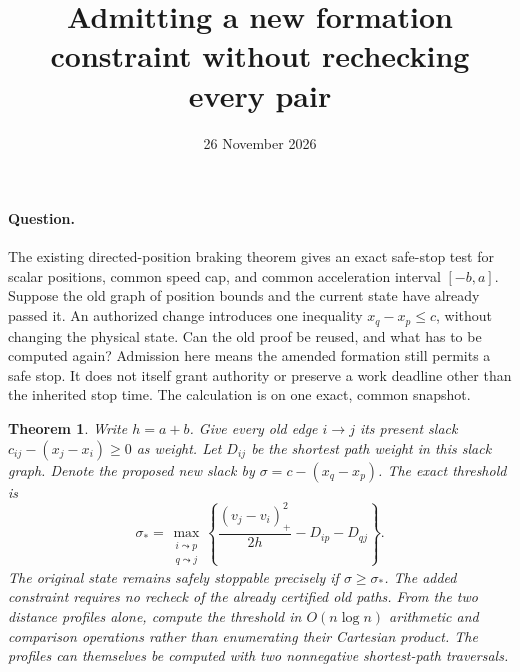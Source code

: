 \documentclass[11pt]{article}
\title{Admitting a new formation constraint without rechecking every pair}
\author{}
\date{26 November 2026}
\newtheorem{theorem}{Theorem}
\begin{document}
\maketitle

\paragraph{Question.}
The existing directed-position braking theorem gives an exact safe-stop test for scalar positions, common speed cap, and common acceleration interval $[-b,a]$. Suppose the old graph of position bounds and the current state have already passed it. An authorized change introduces one inequality $x_q-x_p\le c$, without changing the physical state. Can the old proof be reused, and what has to be computed again? Admission here means the amended formation still permits a safe stop. It does not itself grant authority or preserve a work deadline other than the inherited stop time. The calculation is on one exact, common snapshot.

\begin{theorem}
Write $h=a+b$. Give every old edge $i\to j$ its present slack $c_{ij}-(x_j-x_i)\ge0$ as weight. Let $D_{ij}$ be the shortest path weight in this slack graph. Denote the proposed new slack by $\sigma=c-(x_q-x_p)$. The exact threshold is
\[
 \sigma_*=\max_{\substack{i\leadsto p\\q\leadsto j}}
 \left\{\frac{(v_j-v_i)_+^2}{2h}-D_{ip}-D_{qj}\right\}.
\]
The original state remains safely stoppable precisely if $\sigma\ge\sigma_*$. The added constraint requires no recheck of the already certified old paths. From the two distance profiles alone, compute the threshold in $O(n\log n)$ arithmetic and comparison operations rather than enumerating their Cartesian product. The profiles can themselves be computed with two nonnegative shortest-path traversals.
\end{theorem}
\end{document}
